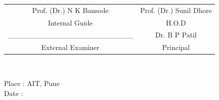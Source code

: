 \vspace*{3 \baselineskip}

\bgroup
\def\arraystretch{0.7}
\begin{table}[h!]
	\centering
	\begin{tabular}{ c c }
	Prof. (Dr.) N K Bansode & \hspace{40 mm} Prof. (Dr.) Sunil Dhore \\
	Internal Guide & \hspace{40 mm} H.O.D \\[1.5cm]
	\vspace{0.1cm}\_\_\_\_\_\_\_\_\_\_\_\_\_\_\_\_\_\_\_\_\_\_\_\_ & \hspace{40 mm} Dr. B P Patil \\
	External Examiner &\hspace{40 mm}Principal\\
	\end{tabular}\\[0.5cm]
\end{table}

Place : AIT, Pune \\
Date{ } : 

\pagebreak
